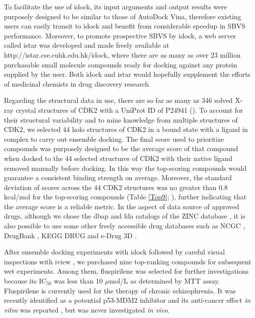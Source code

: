 \documentclass[10pt,letterpaper]{article}
\begin{document}
To facilitate the use of idock, its input arguments and output results were purposely designed to be similar to those of AutoDock Vina, therefore existing users can easily transit to idock and benefit from considerable speedup in SBVS performance. Moreover, to promote prospective SBVS by idock, a web server called istar \cite{1362} was developed and made freely available at http://istar.cse.cuhk.edu.hk/idock, where there are as many as over 23 million purchasable small molecule compounds ready for docking against any protein supplied by the user. Both idock \cite{1153} and istar \cite{1362} would hopefully supplement the efforts of medicinal chemists in drug discovery research.

Regarding the structural data in use, there are so far as many as 346 solved X-ray crystal structures of CDK2 with a UniProt ID of P24941 (). To account for their structural variability and to mine knowledge from multiple structures of CDK2, we selected 44 holo structures of CDK2 in a bound state with a ligand in complex to carry out ensemble docking. The final score used to prioritize compounds was purposely designed to be the average score of that compound when docked to the 44 selected structures of CDK2 with their native ligand removed manually before docking. In this way the top-scoring compounds would guarantee a consistent binding strength on average. Moreover, the standard deviation of scores across the 44 CDK2 structures was no greater than 0.8 kcal/mol for the top-scoring compounds (Table \ref{Top9}; ), further indicating that the average score is a reliable metric. In the aspect of data source of approved drugs, although we chose the dbap and fda catalogs of the ZINC database \cite{532,1178}, it is also possible to use some other freely accessible drug databases such as NCGC \cite{1608}, DrugBank \cite{1594}, KEGG DRUG \cite{1595} and e-Drug 3D \cite{1125}.

After ensemble docking experiments with idock \cite{1153,1362} followed by careful visual inspections with iview \cite{1366}, we purchased nine top-ranking compounds for subsequent wet experiments. Among them, fluspirilene was selected for further investigations because its IC$_{50}$ was less than 10 $\mu$mol/L as determined by MTT assay. Fluspirilene is currently used for the therapy of chronic schizophrenia. It was recently identified as a potential p53-MDM2 inhibitor and its anti-cancer effect \textit{in vitro} was reported \cite{1606}, but was never investigated \textit{in vivo}.
\end{document}
